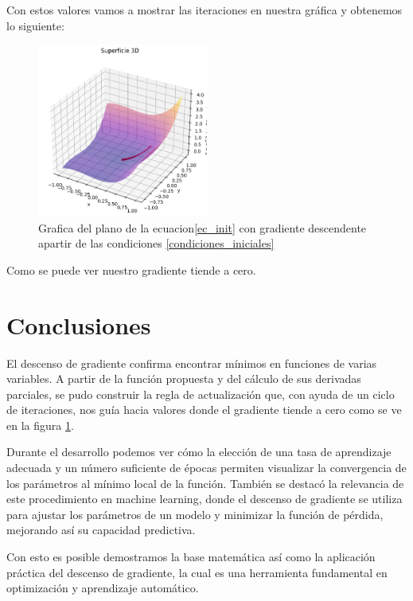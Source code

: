 \documentclass{iopjournal}
\begin{document}
Con estos valores vamos a mostrar las iteraciones en nuestra gráfica y obtenemos lo siguiente:
\begin{figure}[H]
 \centering
        \includegraphics[width=0.5\textwidth]{rsc/gradiente_descendiente.png}
 \caption{Grafica del plano de la ecuacion\ref{ec_init} con gradiente descendente apartir de las condiciones \ref{condiciones_iniciales}}
\label{fig1}
\end{figure}

Como se puede ver nuestro gradiente tiende a cero.

\section{Conclusiones}
El descenso de gradiente confirma encontrar mínimos en funciones de varias variables.  
A partir de la función propuesta y del cálculo de sus derivadas parciales, se pudo construir la regla de actualización que, con ayuda de un ciclo de iteraciones, nos guía hacia valores donde el gradiente tiende a cero como se ve en la figura \ref{fig1}.  

Durante el desarrollo podemos ver cómo la elección de una tasa de aprendizaje adecuada y un número suficiente de épocas permiten visualizar la convergencia de los parámetros al mínimo local de la función. También se destacó la relevancia de este procedimiento en machine learning, donde el descenso de gradiente se utiliza para ajustar los parámetros de un modelo y minimizar la función de pérdida, mejorando así su capacidad predictiva.  

Con esto es posible demostramos la base matemática así como la aplicación práctica del descenso de gradiente, la cual es una herramienta fundamental en optimización y aprendizaje automático.


%
\end{document}
